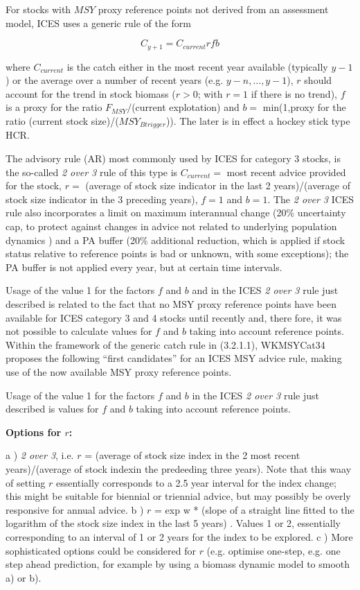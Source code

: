 \documentclass[11pt]{article}
\begin{document}
For stocks with $MSY$ proxy reference points not derived from an assessment model, ICES uses a generic rule of the form 
 
\begin{equation}
C_{y+1}=C_{current}rfb
 \end{equation}

where $C_{current}$ is the catch either in the most recent year available (typically $y-1$) or the average over a number of recent years (e.g. 
$y-n, ... ,y-1$), $r$ should account for the trend in stock biomass ($r>0$; with $r=1$ if there is no trend), $f$  is a proxy for the ratio $F_{MSY}/$(current explotation) and $b=$ min(1,proxy for the ratio (current stock size)/($MSY_{Btrigger}$)). The later is in effect a hockey stick type HCR. 


The advisory rule (AR) most commonly used by ICES for category 3 stocks, is the so-called \textit{2 over 3} rule of this type is $C_{current}=$ most recent advice provided for the stock, $r=$ (average of stock size indicator in the last 2 years)/(average of stock size indicator in the 3 preceding years), $f=1$ and $b=1$. The \textit{2 over 3} ICES rule also incorporates  a  limit  on  maximum  interannual  change  (20\%  uncertainty  cap,  to  protect  against  changes  in  advice  not  related  to  underlying  population  dynamics )  and  a  PA buffer (20\% additional reduction, which is applied if stock status relative to reference 
points is bad or unknown, with some exceptions); the PA buffer is not applied every year, but at certain time intervals.

Usage of the value 1 for the factors $f$ and $b$ and  in the ICES \textit{2 over 3} rule just described is related  to  the  fact  that  no  MSY  proxy  reference  points  have  been  available  for  ICES  
category  3  and  4  stocks  until  recently  and,  there fore,  it  was  not  possible  to  calculate values for $f$ and $b$  taking into account reference points. Within the framework of the generic catch rule in (3.2.1.1), WKMSYCat34 proposes the following “first candidates” for an ICES MSY advice rule, making use of the now available MSY proxy reference points.

  
Usage of the value 1 for the factors $f$ and $b$ in the ICES \textit{2 over 3} rule just described is values for $f$ and $b$ taking into account reference points.

\textbf{Options for $r$:}

a )  \textit{2 over 3}, i.e. $r$ = (average of stock size index in the 2 most recent years)/(average of stock indexin the predeeding three years). Note that this waay of setting $r$ essentially corresponds to a 2.5 year interval for the index change; this might be suitable for biennial or triennial advice, but may possibly be overly responsive for annual advice.
b ) $r$ = exp{ w * (slope of a straight line fitted to the logarithm of the stock size index in the last 5 years) }. Values 1 or 2, essentially corresponding to an interval of 1 or 2 years for the index to be explored.
c )  More sophisticated options could be considered for $r$ (e.g. optimise one-step, e.g. one step ahead prediction, for example by using a biomass dynamic model to smooth a) or b).
\end{document}
